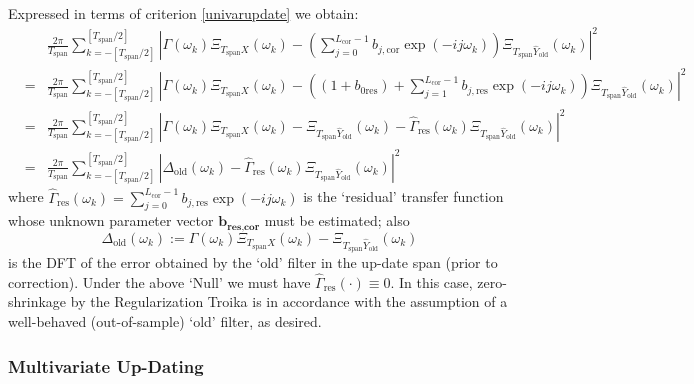 \documentclass[11pt]{article}
\begin{document}
Expressed in terms of criterion \ref{univarupdate} we obtain:
\begin{eqnarray*}
&&\frac{2\pi}{T_{\textrm{span}}} \sum_{k=-[T_{\textrm{span}}/2]}^{[T_{\textrm{span}}/2]}
|\Gamma(\omega_k)\Xi_{T_{\textrm{span}}X}(\omega_k)-\left(\sum_{j=0}^{L_\textrm{cor}-1}b_{j,\textrm{cor}}\exp(-ij\omega_k)\right)\Xi_{T_{\textrm{span}}\hat{Y}_{\textrm{old}}}(\omega_k)|^2\\
&=&\frac{2\pi}{T_{\textrm{span}}} \sum_{k=-[T_{\textrm{span}}/2]}^{[T_{\textrm{span}}/2]}
|\Gamma(\omega_k)\Xi_{T_{\textrm{span}}X}(\omega_k)-\left((1+b_{0\textrm{res}})+\sum_{j=1}^{L_\textrm{cor}-1}b_{j,\textrm{res}}\exp(-ij\omega_k)\right)\Xi_{T_{\textrm{span}}\hat{Y}_{\textrm{old}}}(\omega_k)|^2\\
&=&\frac{2\pi}{T_{\textrm{span}}} \sum_{k=-[T_{\textrm{span}}/2]}^{[T_{\textrm{span}}/2]}
|\Gamma(\omega_k)\Xi_{T_{\textrm{span}}X}(\omega_k)-\Xi_{T_{\textrm{span}}\hat{Y}_{\textrm{old}}}(\omega_k)-\hat{\Gamma}_{\textrm{res}}(\omega_k)\Xi_{T_{\textrm{span}}\hat{Y}_{\textrm{old}}}(\omega_k)|^2\\
&=&\frac{2\pi}{T_{\textrm{span}}} \sum_{k=-[T_{\textrm{span}}/2]}^{[T_{\textrm{span}}/2]}
|\Delta_{\textrm{old}}(\omega_k)-\hat{\Gamma}_{\textrm{res}}(\omega_k)\Xi_{T_{\textrm{span}}\hat{Y}_{\textrm{old}}}(\omega_k)|^2
\end{eqnarray*}
where $\hat{\Gamma}_{\textrm{res}}(\omega_k)=\sum_{j=0}^{L_\textrm{cor}-1}b_{j,\textrm{res}}\exp(-ij\omega_k)$ is the `residual' transfer function whose unknown parameter vector $\mathbf{b_{\textrm{res,cor}}}$ must be estimated; also  
\begin{equation}\label{olderror}\Delta_{\textrm{old}}(\omega_k):=\Gamma(\omega_k)\Xi_{T_{\textrm{span}}X}(\omega_k)-\Xi_{T_{\textrm{span}}\hat{Y}_{\textrm{old}}}(\omega_k)
\end{equation}
is the DFT of the error obtained by the `old' filter in the up-date span (prior to correction). Under the above `Null' we must have $\hat{\Gamma}_{\textrm{res}}(\cdot)\equiv 0$. 
In this case,  zero-shrinkage by the Regularization Troika is in accordance with the assumption of a well-behaved (out-of-sample) `old' filter, as desired. 



 


\subsubsection{Multivariate Up-Dating}
\end{document}
